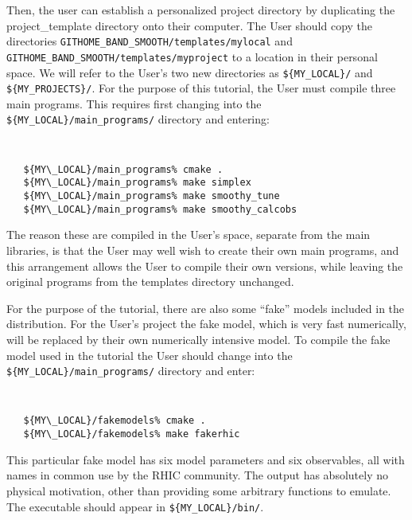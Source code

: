 \documentclass[UserManual.tex]{subfiles}
\begin{document}
Then, the user can establish a personalized project directory by duplicating the project\_template directory onto their computer. The User should copy the directories {\tt GITHOME\_BAND\_SMOOTH/templates/mylocal} and {\tt GITHOME\_BAND\_SMOOTH/templates/myproject} to a location in their personal space. We will refer to the User's two new directories as {\tt \$\{MY\_LOCAL\}/} and {\tt \$\{MY\_PROJECTS\}/}. For the purpose of this tutorial, the User must compile three main programs. This requires first changing into the {\tt \$\{MY\_LOCAL\}/main\_programs/} directory and entering:\\
{\tt
\begin{verbatim}
   ${MY\_LOCAL}/main_programs% cmake .
   ${MY\_LOCAL}/main_programs% make simplex
   ${MY\_LOCAL}/main_programs% make smoothy_tune
   ${MY\_LOCAL}/main_programs% make smoothy_calcobs
\end{verbatim}
}
The reason these are compiled in the User's space, separate from the main libraries, is that the User may well wish to create their own main programs, and this arrangement allows the User to compile their own versions, while leaving the original programs from the templates directory unchanged. 

For the purpose of the tutorial, there are also some ``fake'' models included in the distribution. For the User's project the fake model, which is very fast numerically, will be replaced by their own numerically intensive model. To compile the fake model used in the tutorial the User should change into the {\tt \$\{MY\_LOCAL\}/main\_programs/} directory and enter:
{\tt
\begin{verbatim}
   ${MY\_LOCAL}/fakemodels% cmake .
   ${MY\_LOCAL}/fakemodels% make fakerhic
\end{verbatim}
}
This particular fake model has six model parameters and six observables, all with names in common use by the RHIC community. The output has absolutely no physical motivation, other than providing some arbitrary functions to emulate. The executable should appear in {\tt \$\{MY\_LOCAL\}/bin/}.
\end{document}
